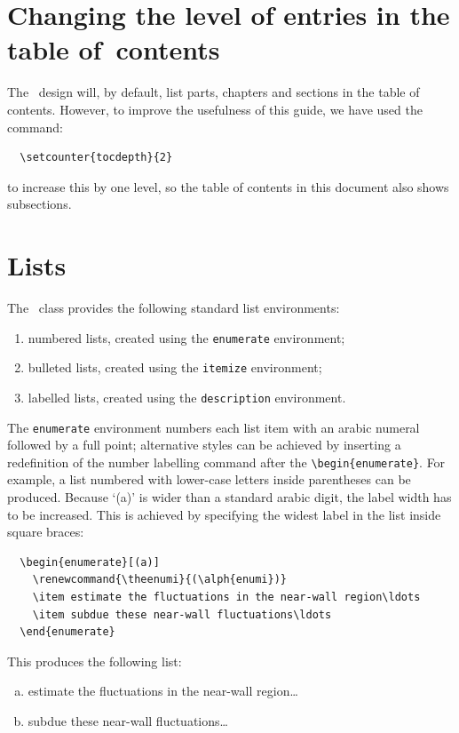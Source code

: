 \section{Changing the level of entries in the table of~contents}
\label{changingentries}
The \cambridge\ design will, by default, list parts, chapters and sections in the table of contents. However, to improve the usefulness of this guide, we have used the command:
\begin{verbatim}
  \setcounter{tocdepth}{2}
\end{verbatim}
to increase this by one level, so the table of contents in this document also shows subsections.


\section{Lists}
\label{lists}

The \cambridge\ class provides the following standard list environments:
\begin{enumerate}
 \item numbered lists, created using the \verb"enumerate" environment;
 \item bulleted lists, created using the \verb"itemize" environment;
 \item labelled lists, created using the \verb"description" environment.
\end{enumerate}
The \verb"enumerate" environment numbers each list item with an arabic numeral followed by a full point; alternative styles can be achieved by inserting a redefinition of the number labelling command after the \verb"\begin{enumerate}". For example, a list numbered with lower-case letters inside parentheses can be produced. Because `(a)' is wider than a standard arabic digit, the label width has to be increased. This is achieved by specifying the widest label in the list inside square braces:
\begin{verbatim}
  \begin{enumerate}[(a)]
    \renewcommand{\theenumi}{(\alph{enumi})}
    \item estimate the fluctuations in the near-wall region\ldots
    \item subdue these near-wall fluctuations\ldots
  \end{enumerate}
\end{verbatim}
\begin{samepage}
This produces the following list:
  \begin{enumerate}[(a)]
    \renewcommand{\theenumi}{(\alph{enumi})}
    \item estimate the fluctuations in the near-wall region\ldots
    \item subdue these near-wall fluctuations\ldots
  \end{enumerate}
\end{samepage}

